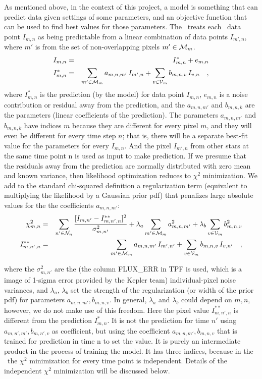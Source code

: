 As mentioned above, in the context of this project,
  a model is something that can predict data given settings of some parameters,
  and an objective function that can be used to find best values for those parameters.
The \name\ treats each \Kepler\ data point $I_{m,n}$ as being
  predictable from a linear combination of data points $I_{m',n}$,
  where $m'$ is from the set of non-overlapping pixels $m'\in\mathcal{M}_m$.
\begin{eqnarray}
I_{m,n}         &=& I^{\ast}_{m,n} + e_{m,n}
\\
I^{\ast}_{m,n}  &=& \sum_{m'\in\mathcal{M}_m} a_{m,n,m'}\,I_{m',n} + \sum_{v\in\mathcal{V}_m} b_{m,n,v}\,I_{v,n}
\quad,
\end{eqnarray}
where $I^{\ast}_{m,n}$ is the prediction (by the model) for data point $I_{m,n}$,
  $e_{m,n}$ is a noise contribution or residual away from the prediction,
  and the $a_{m,n,m'}$ and $b_{m,n,k}$ are the parameters (linear coefficients of the prediction).
The parameters $a_{m,n,m'}$ and $b_{m,n,k}$ have indices $m$ because
  they are different for every pixel $m$,
  and they will even be different for every time step $n$;
  that is, there will be a separate best-fit value for the parameters for every $I_{m,n}$.
And the pixel $I_{m',n}$ from other stars at the same time point n is used as input to make prediction.
If we presume that the residuals away from the prediction are normally distributed with zero mean and known variance, then likelihood optimization reduces to $\chi^2$ minimization.
We add to the standard chi-squared definition a regularization term
  (equivalent to multiplying the likelihood by a Gaussian prior pdf)
  that penalizes large absolute values for the the coefficients $a_{m,n,m'}$:
\begin{eqnarray}
\chi^2_{m,n}    &=& \sum_{n'\in\mathcal{N}_n} \frac{[I_{m,n'} - I^{\ast\ast}_{m,n',n}]^2}{\sigma^2_{m,n'}}
                 + \lambda_{a}\sum_{m'\in\mathcal{M}_m}a_{m,n,m'}^2 + \lambda_{b}\sum_{v\in\mathcal{V}_m}b_{m,n,v}^2
\\
I^{\ast\ast}_{m,n',n} &=& \sum_{m'\in\mathcal{M}_m} a_{m,n,m'}\,I_{m',n'} + \sum_{v\in\mathcal{V}_m} b_{m,n,v}\,I_{v,n'}
\quad,
\end{eqnarray}

where the $\sigma^2_{m,n'}$ are the (the column FLUX\_ERR in TPF is used, which is a image of 1-sigma error provided by the Kepler team) individual-pixel noise variances, and $\lambda_{a}$, $\lambda_{b}$ set the strength of the regularization (or width of the prior pdf) for parameters $a_{m,n,m'}, b_{m,n,v}$. 
In general, $\lambda_a$ and $\lambda_b$ could depend on $m,n$, however, we do not make use of this freedom. 
Here the pixel value $I^{\ast\ast}_{m,n',n}$ is different from the prediction $I^{\ast}_{m,n}$. It is not the prediction for time $n'$ using $a_{m,n',m'}, b_{m,n',v}$ as coefficient, but using the coefficient $a_{m,n,m'}, b_{m,n,v}$ that is trained for prediction in time n to set the value. It is purely an intermediate product in the process of training the model.
It has three indices, because in the \name\ the $\chi^2$ minimization for every time point is independent. Details of the independent $\chi^2$ minimization will be discussed below.

